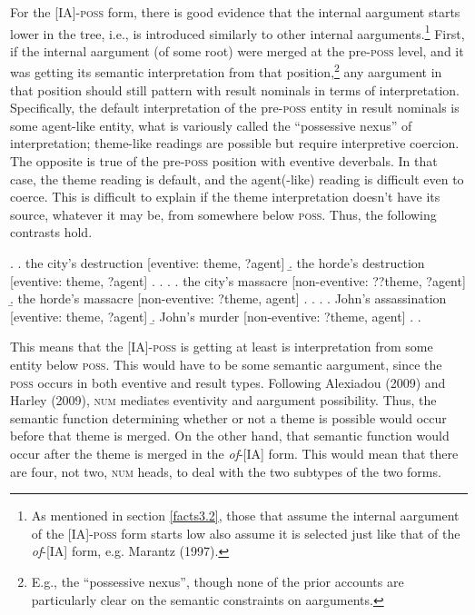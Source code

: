 \documentclass[12pt]{article}
\begin{document}
For the [IA]-\textsc{poss} form, there is good evidence that the internal aargument starts lower in the tree, i.e., is introduced similarly to other internal aarguments.\footnote{ As mentioned in section \ref{facts3.2}, those that assume the internal aargument of the [IA]-\textsc{poss} form starts low also assume it is selected just like that of the \textit{of}-[IA] form, e.g. Marantz (1997).} First, if the internal aargument (of some root) were merged at the pre-\textsc{poss} level, and it was getting its semantic interpretation from that position,\footnote{ E.g., the ``possessive nexus'', though none of the prior accounts are particularly clear on the semantic constraints on aarguments.} any aargument in that position should still pattern with result nominals in terms of interpretation. Specifically, the default interpretation of the pre-\textsc{poss} entity in result nominals is some agent-like entity, what is variously called the ``possessive nexus'' of interpretation; theme-like readings are possible but require interpretive coercion. The opposite is true of the pre-\textsc{poss} position with eventive deverbals. In that case, the theme reading is default, and the agent(-like) reading is difficult even to coerce. This is difficult to explain if the theme interpretation doesn't have its source, whatever it may be, from somewhere below \textsc{poss}. Thus, the following contrasts hold.

\singlespacing
\ex. 
\a. the city's destruction \hfill [eventive: theme, ?agent]
\b. the horde's destruction \hfill [eventive: theme, ?agent]
\z. \z. 
\ex. 
\a. the city's massacre \hfill [non-eventive: ??theme, ?agent]
\b. the horde's massacre \hfill [non-eventive: ?theme, agent]
\z. \z. 
\ex. 
\a. John's assassination \hfill [eventive: theme, ?agent]
\b. John's murder \hfill [non-eventive: ?theme, agent]
\z. \z. \par \par

\doublespacing

This means that the [IA]-\textsc{poss} is getting at least is interpretation from some entity below \textsc{poss}. This would have to be some semantic aargument, since the \textsc{poss} occurs in both eventive and result types. Following Alexiadou (2009) and Harley (2009), \textsc{num} mediates eventivity and aargument possibility. Thus, the semantic function determining whether or not a theme is possible would occur before that theme is merged. On the other hand, that semantic function would occur after the theme is merged in the \textit{of}-[IA] form. This would mean that there are four, not two, \textsc{num} heads, to deal with the two subtypes of the two forms. 
\end{document}
